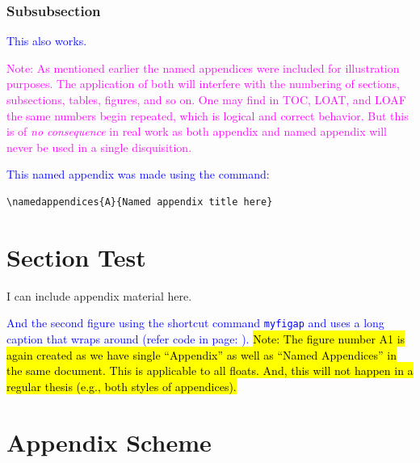 \documentclass[phd]{ndsu-thesis-2022}
\newcommand\italk[1]{\textcolor{blue}{#1}}  %
\begin{document}
\subsubsection{Subsubsection}
\italk{This also works.}



\textcolor{magenta}{Note: As mentioned earlier the named appendices were included for illustration purposes. The application of both will interfere with the numbering of sections, subsections, tables, figures, and so on. One may find in TOC, LOAT, and LOAF the same numbers begin repeated, which is logical and correct behavior. But this is of \emph{no consequence} in real work as both appendix and named appendix will never be used in a single disquisition.}

\italk{This named appendix was made using the command:}

\begin{verbatim}
\namedappendices{A}{Named appendix title here}
\end{verbatim}

\section{Section Test}

I can include appendix material here. 

\italk{And the second figure using the shortcut command \texttt{myfigap} and uses a long caption that wraps around (refer code in page: \pageref{figv}).} \hl{Note: The figure number A1 is again created as we have single ``Appendix'' as well as ``Named Appendices'' in the same document. This is applicable to all floats. And, this will not happen in a regular thesis (e.g., both styles of appendices).}


\kant[1]

\section{Appendix Scheme}\label{appsch}
\end{document}
